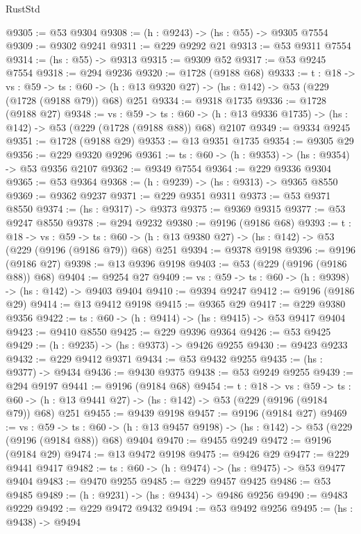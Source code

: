 \begin{lexlean}{RustStd}
\begin{coremodule}
@9305 := @53 @9304
@9308 := (h : @9243) -> (hs : @55) -> @9305 @7554
@9309 := @9302 @9241
@9311 := @229 @9292 @21
@9313 := @53 @9311 @7554
@9314 := (hs : @55) -> @9313
@9315 := @9309 @52
@9317 := @53 @9245 @7554
@9318 := @294 @9236
@9320 := @1728 (@9188 @68)
@9333 := {t : @18} ->
  {vs : @59} ->
  {ts : @60} -> (h : @13 @9320 @27) -> (hs : @142) -> @53 (@229 (@1728 (@9188 @79)) @68) @251
@9334 := @9318 @1735
@9336 := @1728 (@9188 @27)
@9348 := {vs : @59} ->
  {ts : @60} -> (h : @13 @9336 @1735) -> (hs : @142) -> @53 (@229 (@1728 (@9188 @88)) @68) @2107
@9349 := @9334 @9245
@9351 := @1728 (@9188 @29)
@9353 := @13 @9351 @1735
@9354 := @9305 @29
@9356 := @229 @9320 @9296
@9361 := {ts : @60} -> (h : @9353) -> (hs : @9354) -> @53 @9356 @2107
@9362 := @9349 @7554
@9364 := @229 @9336 @9304
@9365 := @53 @9364
@9368 := (h : @9239) -> (hs : @9313) -> @9365 @8550
@9369 := @9362 @9237
@9371 := @229 @9351 @9311
@9373 := @53 @9371 @8550
@9374 := (hs : @9317) -> @9373
@9375 := @9369 @9315
@9377 := @53 @9247 @8550
@9378 := @294 @9232
@9380 := @9196 (@9186 @68)
@9393 := {t : @18} ->
  {vs : @59} ->
  {ts : @60} -> (h : @13 @9380 @27) -> (hs : @142) -> @53 (@229 (@9196 (@9186 @79)) @68) @251
@9394 := @9378 @9198
@9396 := @9196 (@9186 @27)
@9398 := @13 @9396 @9198
@9403 := @53 (@229 (@9196 (@9186 @88)) @68)
@9404 := @9254 @27
@9409 := {vs : @59} -> {ts : @60} -> (h : @9398) -> (hs : @142) -> @9403 @9404
@9410 := @9394 @9247
@9412 := @9196 (@9186 @29)
@9414 := @13 @9412 @9198
@9415 := @9365 @29
@9417 := @229 @9380 @9356
@9422 := {ts : @60} -> (h : @9414) -> (hs : @9415) -> @53 @9417 @9404
@9423 := @9410 @8550
@9425 := @229 @9396 @9364
@9426 := @53 @9425
@9429 := (h : @9235) -> (hs : @9373) -> @9426 @9255
@9430 := @9423 @9233
@9432 := @229 @9412 @9371
@9434 := @53 @9432 @9255
@9435 := (hs : @9377) -> @9434
@9436 := @9430 @9375
@9438 := @53 @9249 @9255
@9439 := @294 @9197
@9441 := @9196 (@9184 @68)
@9454 := {t : @18} ->
  {vs : @59} ->
  {ts : @60} -> (h : @13 @9441 @27) -> (hs : @142) -> @53 (@229 (@9196 (@9184 @79)) @68) @251
@9455 := @9439 @9198
@9457 := @9196 (@9184 @27)
@9469 := {vs : @59} ->
  {ts : @60} -> (h : @13 @9457 @9198) -> (hs : @142) -> @53 (@229 (@9196 (@9184 @88)) @68) @9404
@9470 := @9455 @9249
@9472 := @9196 (@9184 @29)
@9474 := @13 @9472 @9198
@9475 := @9426 @29
@9477 := @229 @9441 @9417
@9482 := {ts : @60} -> (h : @9474) -> (hs : @9475) -> @53 @9477 @9404
@9483 := @9470 @9255
@9485 := @229 @9457 @9425
@9486 := @53 @9485
@9489 := (h : @9231) -> (hs : @9434) -> @9486 @9256
@9490 := @9483 @9229
@9492 := @229 @9472 @9432
@9494 := @53 @9492 @9256
@9495 := (hs : @9438) -> @9494

\end{coremodule}
\end{lexlean}
